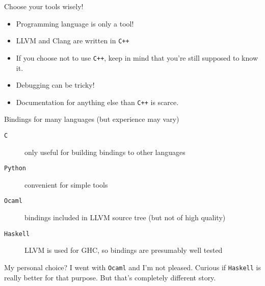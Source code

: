 \documentclass[8pt]{beamer}
\begin{document}
\begin{frame}{Choose your tools wisely!}
  \begin{alertblock}{}
    \begin{itemize}
      \item Programming language is only a tool!
      \item LLVM and Clang are written in \texttt{C++}
      \item If you choose not to use \texttt{C++}, keep in mind that you're
        still supposed to know it.
      \item Debugging can be tricky!
      \item Documentation for anything else than \texttt{C++} is scarce.
    \end{itemize}
  \end{alertblock}

  \begin{block}{Bindings for many languages (but experience may vary)}
    \begin{description}
      \item[\texttt{C}] only useful for building bindings to other languages
      \item[\texttt{Python}] convenient for simple tools
      \item[\texttt{Ocaml}] bindings included in LLVM source tree (but not
        of high quality)
      \item[\texttt{Haskell}] LLVM is used for GHC, so bindings are presumably
        well tested
    \end{description}
  \end{block}

  \begin{exampleblock}{}
    My personal choice? I went with \texttt{Ocaml} and I'm not pleased. Curious
    if \texttt{Haskell} is really better for that purpose. But that's
    completely different story.
  \end{exampleblock}
\end{frame}
\end{document}
